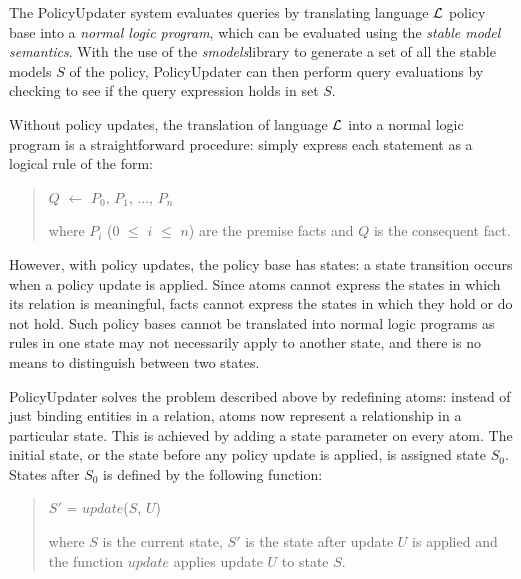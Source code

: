 \documentclass[11pt]{llncs}
\begin{document}
      The PolicyUpdater system evaluates queries by translating language
      ${\cal L}$ policy base into a {\em normal logic program}, which can be
      evaluated using the {\em stable model semantics}. With the use of the
      {\em smodels}\footnotemark library to generate a set of all the stable
      models $S$ of the policy, PolicyUpdater can then perform query
      evaluations by checking to see if the query expression holds in set $S$.


      Without policy updates, the translation of language ${\cal L}$ into a
      normal logic program is a straightforward procedure: simply express each
      statement as a logical rule of the form:

      \begin{quote}
        $Q$ $\leftarrow$ $P_{0}$, $P_{1}$, ..., $P_{n}$

        where $P_{i}$ ($0$ $\leq$ $i$ $\leq$ $n$) are the premise facts and $Q$
        is the consequent fact.
      \end{quote}

      However, with policy updates, the policy base has states: a state
      transition occurs when a policy update is applied. Since atoms cannot
      express the states in which its relation is meaningful, facts cannot
      express the states in which they hold or do not hold. Such policy bases
      cannot be translated into normal logic programs as rules in one state
      may not necessarily apply to another state, and there is no means to
      distinguish between two states.

      PolicyUpdater solves the problem described above by redefining atoms:
      instead of just binding entities in a relation, atoms now represent
      a relationship in a particular state. This is achieved by adding a state
      parameter on every atom. The initial state, or the state before any
      policy update is applied, is assigned state $S_{0}$. States after $S_{0}$
      is defined by the following function:

      \begin{quote}
        $S'$ = $update$($S$, $U$)

        where $S$ is the current state, $S'$ is the state after update $U$ is
        applied and the function $update$ applies update $U$ to state $S$.
      \end{quote}
\end{document}
